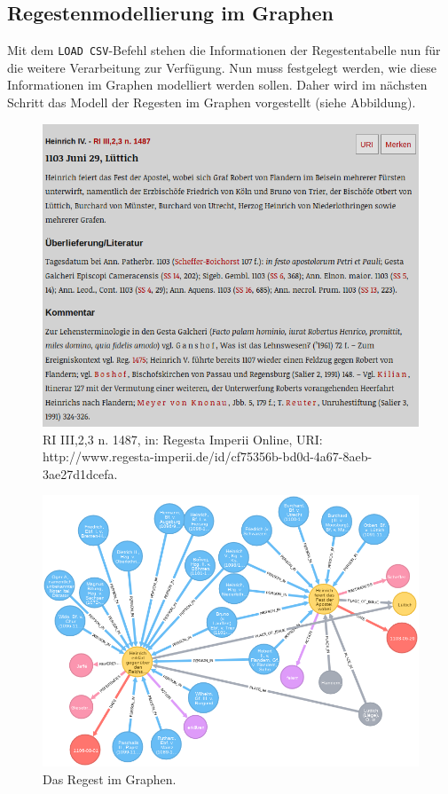 \documentclass[ngerman,]{scrreprt}
\begin{document}
\hypertarget{regestenmodellierung-im-graphen-1}{%
\subsection{Regestenmodellierung im Graphen}\label{regestenmodellierung-im-graphen-1}}

Mit dem \texttt{LOAD\ CSV}-Befehl stehen die Informationen der Regestentabelle nun für die weitere Verarbeitung zur Verfügung. Nun muss festgelegt werden, wie diese Informationen im Graphen modelliert werden sollen. Daher wird im nächsten Schritt das Modell der Regesten im Graphen vorgestellt (siehe Abbildung).

\begin{figure}
\centering
\includegraphics{Bilder/RI2Graph/ReggH4-Nr-1487.png}
\caption{RI III,2,3 n. 1487, in: Regesta Imperii Online, URI: http://www.regesta-imperii.de/id/cf75356b-bd0d-4a67-8aeb-3ae27d1dcefa.}
\end{figure}

\begin{figure}
\centering
\includegraphics{Bilder/RI2Graph/ReggH4-Nr-1487imGraph.png}
\caption{Das Regest im Graphen.}
\end{figure}
\end{document}

